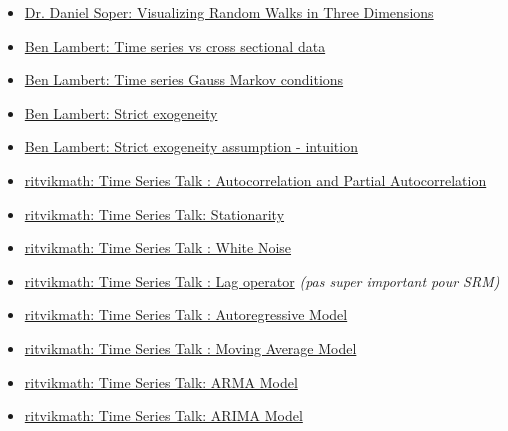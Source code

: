 \documentclass[12pt, titlepage, french]{report}
\begin{document}
\begin{YTB_vids}
\begin{itemize}
	\item	\href{https://www.youtube.com/watch?v=7A83lXbs6Ik}{Dr. Daniel Soper: Visualizing Random Walks in Three Dimensions}
	\item	\href{https://www.youtube.com/watch?v=-gmlyRRscXo}{Ben Lambert: Time series vs cross sectional data}
	\item	\href{https://www.youtube.com/watch?v=bWo_ka37szw&list=PLvo9ZnEQG5oXC-cg8ecXr6SJZWprEL1UC&index=3}{Ben Lambert: Time series Gauss Markov conditions}
	\item	\href{https://www.youtube.com/watch?v=LgIOgb-6mYA&list=PLvo9ZnEQG5oXC-cg8ecXr6SJZWprEL1UC&index=3}{Ben Lambert: Strict exogeneity}
	\item	\href{https://www.youtube.com/watch?v=a7_3qX67e7c&list=PLvo9ZnEQG5oXC-cg8ecXr6SJZWprEL1UC&index=4}{Ben Lambert: Strict exogeneity assumption - intuition}
	\item	\href{https://www.youtube.com/watch?v=DeORzP0go5I&list=PLvcbYUQ5t0UHOLnBzl46_Q6QKtFgfMGc3&index=14}{ritvikmath: Time Series Talk : Autocorrelation and Partial Autocorrelation}
	\item	\href{https://www.youtube.com/watch?v=oY-j2Wof51c&list=PLvcbYUQ5t0UHOLnBzl46_Q6QKtFgfMGc3&index=6}{ritvikmath: Time Series Talk: Stationarity}
	\item	\href{https://www.youtube.com/watch?v=cr4zIXAmSRI}{ritvikmath: Time Series Talk : White Noise}
	\item	\href{https://www.youtube.com/watch?v=VPNijQ2L3XM&list=PLvcbYUQ5t0UHOLnBzl46_Q6QKtFgfMGc3&index=4}{ritvikmath: Time Series Talk : Lag operator} \textit{(pas super important pour SRM)}
	\item	\href{https://www.youtube.com/watch?v=5-2C4eO4cPQ}{ritvikmath: Time Series Talk : Autoregressive Model}
	\item	\href{https://www.youtube.com/watch?v=voryLhxiPzE&list=PLvcbYUQ5t0UHOLnBzl46_Q6QKtFgfMGc3&index=6}{ritvikmath: Time Series Talk : Moving Average Model}
	\item	\href{https://www.youtube.com/watch?v=HhvTlaN06AM&list=PLvcbYUQ5t0UHOLnBzl46_Q6QKtFgfMGc3&index=9}{ritvikmath: Time Series Talk: ARMA Model}
	\item	\href{https://www.youtube.com/watch?v=3UmyHed0iYE&list=PLvcbYUQ5t0UHOLnBzl46_Q6QKtFgfMGc3&index=9}{ritvikmath: Time Series Talk: ARIMA Model}

\end{itemize}
\end{YTB_vids}
\end{document}
